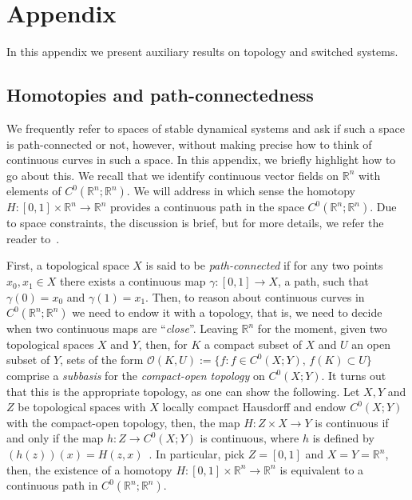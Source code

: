 \documentclass[letterpaper, 10 pt, conference]{ieeeconf}  %
\theoremstyle{mystyle}
\begin{document}
\section{Appendix}
In this appendix we present auxiliary results on topology and switched systems. 
\label{sec:app}
{
\subsection{Homotopies and path-connectedness}
\label{sec:homotopy:path}
We frequently refer to spaces of stable dynamical systems and ask if such a space is path-connected or not, however, without making precise how to think of continuous curves in such a space. In this appendix, we briefly highlight how to go about this. We recall that we identify continuous vector fields on $\mathbb{R}^n$ with elements of $C^0(\mathbb{R}^n;\mathbb{R}^n)$. We will address in which sense the homotopy $H:[0,1]\times \mathbb{R}^n\to \mathbb{R}^n$ provides a continuous path in the space $C^0(\mathbb{R}^n;\mathbb{R}^n)$.
Due to space constraints, the discussion is brief, but for more details, we refer the reader to~\cite{ref:hirsch1976differential,munkres2014pearson}.

First, a topological space $X$ is said to be \textit{path-connected} if for any two points $x_0,x_1\in X$ there exists a continuous map $\gamma:[0,1]\to X$, a path, such that $\gamma(0)=x_0$ and $\gamma(1)=x_1$. Then, to reason about continuous curves in $C^0(\mathbb{R}^n;\mathbb{R}^n)$ we need to endow it with a topology, that is, we need to decide when two continuous maps are ``\textit{close}''. Leaving $\mathbb{R}^n$ for the moment, given two topological spaces $X$ and $Y$, then, for $K$ a compact subset of $X$ and $U$ an open subset of $Y$, sets of the form $\mathcal{O}(K,U):=\{f:f\in C^0(X;Y),\, f(K)\subset U\}$ comprise a \textit{subbasis} for the \textit{compact-open topology} on $C^0(X;Y)$. It turns out that this is the appropriate topology, as one can show the following. Let $X,Y$ and $Z$ be topological spaces with $X$ locally compact Hausdorff and endow $C^0(X;Y)$ with the compact-open topology, then, the map $H:Z\times X\to Y$ is continuous if and only if the map $h:Z\to C^0(X;Y)$ is continuous, where $h$ is defined by $(h(z))(x)=H(z,x)$~\cite[Thm.~46.11]{munkres2014pearson}. In particular, pick $Z=[0,1]$ and $X=Y=\mathbb{R}^n$, then, the existence of a homotopy $H:[0,1]\times \mathbb{R}^n\to \mathbb{R}^n$ is equivalent to a continuous path in $C^0(\mathbb{R}^n;\mathbb{R}^n)$.
}
\end{document}
